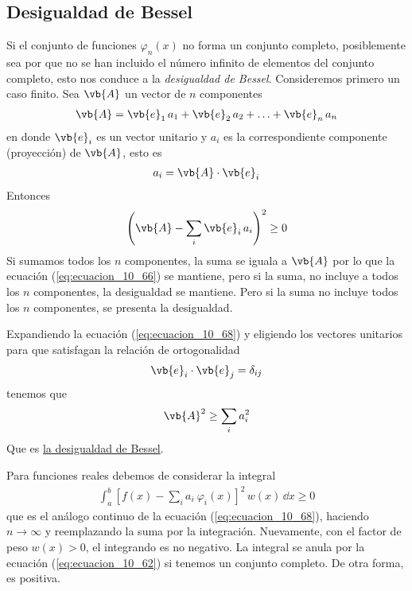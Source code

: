 \subsection{Desigualdad de Bessel}
Si el conjunto de funciones $\varphi_{n} (x)$ no forma un conjunto completo, posiblemente sea por que no se han incluido el número infinito de elementos del conjunto completo, esto nos conduce a la \emph{desigualdad de Bessel}. Consideremos primero un caso finito. Sea $\vb{A}$ un vector de $n$ componentes
\begin{align}
\vb{A} = \vb{e}_{1} \, a_{1} + \vb{e}_{2} \, a_{2} + \ldots + \vb{e}_{n} \, a_{n} 
\label{eq:ecuacion_10_66}
\end{align}
en donde $\vb{e}_{i}$ es un vector unitario y $a_{i}$ es la correspondiente componente (proyección) de $\vb{A}$, esto es
\begin{align}
a_{i} = \vb{A} \cdot \vb{e}_{i}
\label{eq:ecuacion_10_67}
\end{align}
Entonces
\begin{align}
\left( \vb{A} - \sum_{i} \vb{e}_{i} \, a_{i} \right)^{2} \geq 0
\label{eq:ecuacion_10_68}
 \end{align}
Si sumamos todos los $n$ componentes, la suma se iguala a $\vb{A}$ por lo que la ecuación (\ref{eq:ecuacion_10_66}) se mantiene, pero si la suma, no incluye a todos los $n$ componentes, la desigualdad se mantiene. Pero si la suma no incluye todos los $n$ componentes, se presenta la desigualdad.
\par
Expandiendo la ecuación (\ref{eq:ecuacion_10_68}) y eligiendo los vectores unitarios para que satisfagan la relación de ortogonalidad
\begin{align}
\vb{e}_{i} \cdot \vb{e}_{j} =  \delta_{ij}
\label{eq:ecuacion_10_69}
\end{align}
tenemos que
\begin{align}
\vb{A}^{2} \geq \sum_{i} a_{i}^{2}
\label{eq:ecuacion_10_70}
\end{align}
Que es \underline{la desigualdad de Bessel}.
\par
Para funciones reales debemos de considerar la integral
\begin{align}
\int_{a}^{b} \left[ f(x) - \sum_{i} a_{i} \: \varphi_{i}(x) \right]^{2} \, w(x) \, \dd{x} \geq 0
\label{eq:ecuacion_10_71}
\end{align}
que es el análogo continuo de la ecuación (\ref{eq:ecuacion_10_68}), haciendo $n \to \infty$ y reemplazando la suma por la integración. Nuevamente, con el factor de peso $w(x) > 0 $, el integrando es no negativo. La integral se anula por la ecuación (\ref{eq:ecuacion_10_62}) si tenemos un conjunto completo. De otra forma, es positiva.

